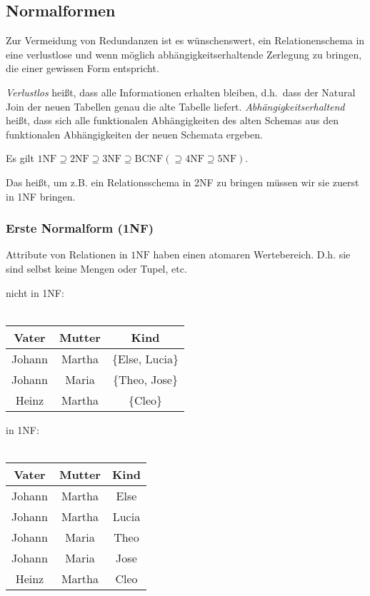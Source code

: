 \documentclass[a4paper,parskip=half*,DIV=15,fontsize=11pt]{scrartcl}
\newcommand{\NF}{\mathrm{NF}} %
\newcommand{\BCNF}{\mathrm{BCNF}} %
\begin{document}
\subsection{Normalformen} \label{sec:normalformen}
Zur Vermeidung von Redundanzen ist es wünschenswert, ein Relationenschema in eine verlustlose und wenn möglich abhängigkeitserhaltende Zerlegung zu bringen, die einer gewissen Form entspricht.

\emph{Verlustlos} heißt, dass alle Informationen erhalten bleiben, d.h.\ dass der Natural Join der neuen Tabellen genau die alte Tabelle liefert.
\emph{Abhängigkeitserhaltend} heißt, dass sich alle funktionalen Abhängigkeiten des alten Schemas aus den funktionalen Abhängigkeiten der neuen Schemata ergeben.

Es gilt $1\NF \supseteq 2\NF \supseteq 3\NF \supseteq \BCNF (\supseteq 4\NF \supseteq 5\NF)$.

Das heißt, um z.B. ein Relationsschema in 2NF zu bringen müssen wir sie zuerst in 1NF bringen.
\subsubsection{Erste Normalform (1NF)}

Attribute von Relationen in $1\NF$ haben einen atomaren Wertebereich. D.h. sie sind selbst keine Mengen oder Tupel, etc.


\begin{minipage}[t]{0.5\textwidth}
\begin{center}
 nicht in 1NF: \\
\ \\
  \begin{tabular}{ | c | c | c |}
    \hline
    Vater & Mutter & Kind \\ \hline \hline
    Johann & Martha & \{Else, Lucia\} \\ \hline
    Johann & Maria & \{Theo, Jose\} \\ \hline
    Heinz & Martha & \{Cleo\} \\ \hline
  \end{tabular}
\end{center}
\end{minipage}
\begin{minipage}[t]{0.5\textwidth}
\begin{center}
  in 1NF: \\
\ \\
  \begin{tabular}{ | c | c | c |}
    \hline
    Vater & Mutter & Kind \\ \hline \hline
    Johann & Martha & Else \\ \hline
    Johann & Martha & Lucia \\ \hline
    Johann & Maria & Theo \\ \hline
    Johann & Maria & Jose \\ \hline
    Heinz & Martha & Cleo \\ \hline
  \end{tabular}
\end{center}
\end{minipage}
\end{document}

